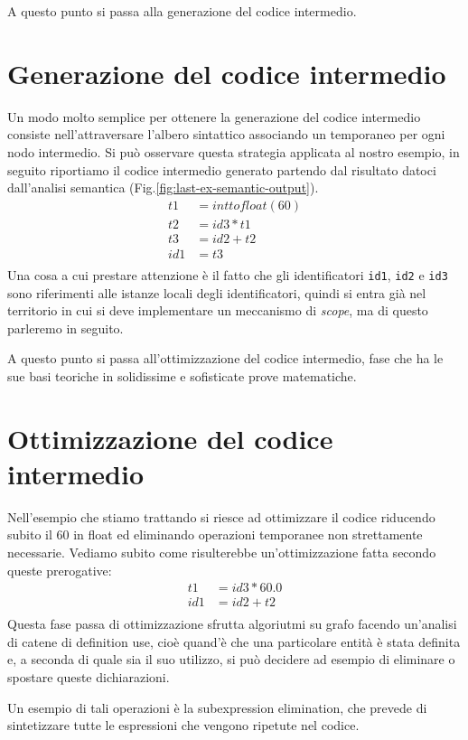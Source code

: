 \documentclass[class=book, crop=false, oneside, 12pt]{standalone}
\begin{document}
A questo punto si passa alla generazione del codice intermedio.

\section{Generazione del codice intermedio}
Un modo molto semplice per ottenere la generazione del codice intermedio consiste nell'attraversare l'albero sintattico associando un temporaneo per ogni nodo intermedio.
Si può osservare questa strategia applicata al nostro esempio, in seguito riportiamo il codice intermedio generato partendo dal risultato datoci dall'analisi semantica (Fig.\ref{fig:last-ex-semantic-output}).
\begin{align*}
    t1 &= inttofloat(60) \\
    t2 &= id3 * t1 \\
    t3 &= id2 + t2 \\
    id1 &= t3 \\
\end{align*}
Una cosa a cui prestare attenzione è il fatto che gli identificatori \texttt{id1}, \texttt{id2} e \texttt{id3} sono riferimenti alle istanze locali degli identificatori, quindi si entra già nel territorio in cui si deve implementare un meccanismo di \emph{scope}, ma di questo parleremo in seguito.

A questo punto si passa all'ottimizzazione del codice intermedio, fase che ha le sue basi teoriche in solidissime e sofisticate prove matematiche.

\section{Ottimizzazione del codice intermedio}
Nell'esempio che stiamo trattando si riesce ad ottimizzare il codice riducendo subito il \(60\) in float ed eliminando operazioni temporanee non strettamente necessarie. Vediamo subito come risulterebbe un'ottimizzazione fatta secondo queste prerogative:
\begin{align*}
    t1 &= id3 * 60.0 \\
    id1 &= id2 + t2 \\
\end{align*}
Questa fase passa di ottimizzazione sfrutta algoriutmi su grafo facendo un'analisi di catene di definition use, cioè quand'è che una particolare entità è stata definita e, a seconda di quale sia il suo utilizzo, si può decidere ad esempio di eliminare o spostare queste dichiarazioni.

Un esempio di tali operazioni è la subexpression elimination, che prevede di sintetizzare tutte le espressioni che vengono ripetute nel codice.
\end{document}
